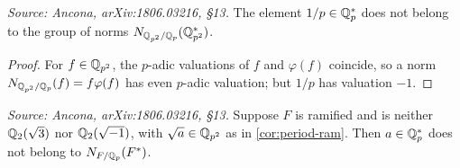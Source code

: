 \begin{lemma}
  \label{lem:not-norm-unram}
  \textit{Source: Ancona, arXiv:1806.03216, \S13.}
  The element \(1/p \in \mathbb{Q}_p^*\) does not belong to the group of norms
  \(N_{\mathbb{Q}_{p^2}/\mathbb{Q}_p}(\mathbb{Q}_{p^2}^*)\).
\end{lemma}

\begin{proof}
  For \(f \in \mathbb{Q}_{p^2}\), the \(p\)-adic valuations of \(f\) and \(\varphi(f)\)
  coincide, so a norm \(N_{\mathbb{Q}_{p^2}/\mathbb{Q}_p}(f) = f \varphi(f)\) has even
  \(p\)-adic valuation; but \(1/p\) has valuation \(-1\).
\end{proof}

\begin{lemma}
  \label{lem:not-norm-ram}
  \textit{Source: Ancona, arXiv:1806.03216, \S13.}
  Suppose \(F\) is ramified and is neither \(\mathbb{Q}_2(\sqrt 3)\) nor
  \(\mathbb{Q}_2(\sqrt{-1})\), with \(\sqrt{a} \in \mathbb{Q}_{p^2}\) as in
  \cref{cor:period-ram}. Then \(a \in \mathbb{Q}_p^*\) does not belong to
  \(N_{F/\mathbb{Q}_p}(F^*)\).
\end{lemma}

